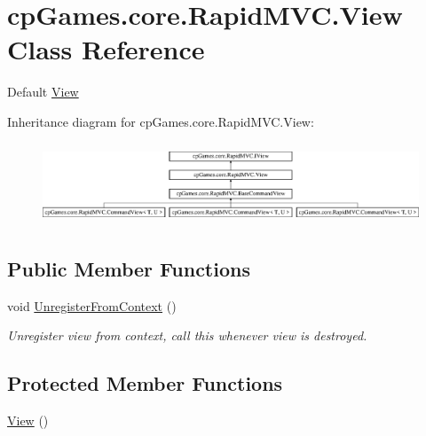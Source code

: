 \hypertarget{classcp_games_1_1core_1_1_rapid_m_v_c_1_1_view}{}\section{cp\+Games.\+core.\+Rapid\+M\+V\+C.\+View Class Reference}
\label{classcp_games_1_1core_1_1_rapid_m_v_c_1_1_view}


Default \mbox{\hyperlink{classcp_games_1_1core_1_1_rapid_m_v_c_1_1_view}{View}}  


Inheritance diagram for cp\+Games.\+core.\+Rapid\+M\+V\+C.\+View\+:\begin{figure}[H]
\begin{center}
\leavevmode
\includegraphics[height=2.472406cm]{classcp_games_1_1core_1_1_rapid_m_v_c_1_1_view}
\end{center}
\end{figure}
\subsection*{Public Member Functions}
\begin{DoxyCompactItemize}
\item 
void \mbox{\hyperlink{classcp_games_1_1core_1_1_rapid_m_v_c_1_1_view_a4b7e26a0ea011dac7cf83be10645db4d}{Unregister\+From\+Context}} ()
\begin{DoxyCompactList}\small\item\em Unregister view from context, call this whenever view is destroyed. \end{DoxyCompactList}\end{DoxyCompactItemize}
\subsection*{Protected Member Functions}
\begin{DoxyCompactItemize}
\item 
\mbox{\hyperlink{classcp_games_1_1core_1_1_rapid_m_v_c_1_1_view_a40db8f93a7952a91c90183ded2f44640}{View}} ()
\end{DoxyCompactItemize}
